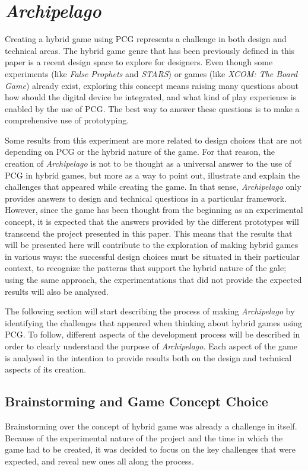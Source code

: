 \chapter{\textit{Archipelago}}
Creating a hybrid game using PCG represents a challenge in both design and technical areas. The hybrid game genre that has been previously defined in this paper is a recent design space to explore for designers. Even though some experiments (like \textit{False Prophets} and \textit{STARS}) or games (like \textit{XCOM: The Board Game}) already exist, exploring this concept means raising many questions about how should the digital device be integrated, and what kind of play experience is enabled by the use of PCG. The best way to answer these questions is to make a comprehensive use of prototyping.

Some results from this experiment are more related to design choices that are not depending on PCG or the hybrid nature of the game. For that reason, the creation of \textit{Archipelago} is not to be thought as a universal answer to the use of PCG in hybrid games, but more as a way to point out, illustrate and explain the challenges that appeared while creating the game. In that sense, \textit{Archipelago} only provides answers to design and technical questions in a particular framework. However, since the game has been thought from the beginning as an experimental concept, it is expected that the answers provided by the different prototypes will transcend the project presented in this paper. This means that the results that will be presented here will contribute to the exploration of making hybrid games in various ways: the successful design choices must be situated in their particular context, to recognize the patterns that support the hybrid nature of the gale; using the same approach, the experimentations that did not provide the expected results will also be analysed.

The following section will start describing the process of making \textit{Archipelago} by identifying the challenges that appeared when thinking about hybrid games using PCG. To follow, different aspects of the development process will be described in order to clearly understand the purpose of \textit{Archipelago}. Each aspect of the game is analysed in the intention to provide results both on the design and technical aspects of its creation. 
\section{Brainstorming and Game Concept Choice}
Brainstorming over the concept of hybrid game was already a challenge in itself. Because of the experimental nature of the project and the time in which the game had to be created, it was decided to focus on the key challenges that were expected, and reveal new ones all along the process.
